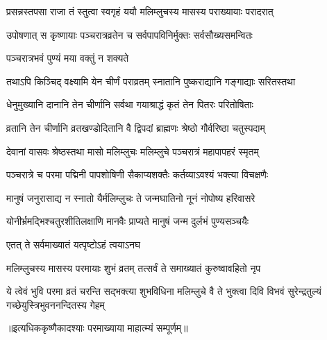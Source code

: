 \twolineshloka
{प्रसन्नस्तपसा राजा तं स्तुत्वा स्वगृहं ययौ}
{मलिम्लुचस्य मासस्य पराख्यायाः परादरात्} %

\twolineshloka
{उपोषणात् स कृष्णायाः पञ्चरात्रव्रतेन च}
{सर्वपापविनिर्मुक्तः सर्वसौख्यसमन्वितः} %



\onelineshloka
{पञ्चरात्रभवं पुण्यं मया वक्तुं न शक्यते} %

\twolineshloka
{तथाऽपि किञ्चिद् वक्ष्यामि येन चीर्णं पराव्रतम्}
{स्नातानि पुष्कराद्यानि गङ्गाद्याः सरितस्तथा} %

\twolineshloka
{धेनुमुख्यानि दानानि तेन चीर्णानि सर्वथा}
{गयाश्राद्धं कृतं तेन पितरः परितोषिताः} %

\twolineshloka
{व्रतानि तेन चीर्णानि व्रतखण्डोदितानि वै}
{द्विपदां ब्राह्मणः श्रेष्ठो गौर्वरिष्ठा चतुस्पदाम्} %

\twolineshloka
{देवानां वासवः श्रेष्ठस्तथा मासो मलिम्लुचः}
{मलिम्लुचे पञ्चरात्रं महापापहरं स्मृतम्} %

\twolineshloka
{पञ्चरात्रे च परमा पद्मिनी पापशोषिणी}
{सैकाप्यशक्तैः कर्तव्याऽवश्यं भक्त्या विचक्षणैः} %

\twolineshloka
{मानुषं जनुरासाद्य न स्नातो यैर्मलिम्लुचः}
{ते जन्मघातिनो नूनं नोपोष्य हरिवासरे} %

\twolineshloka
{योनीर्भ्रमद्भिश्चतुरशीतिलक्षाणि मानवैः}
{प्राप्यते मानुषं जन्म दुर्लभं पुण्यसञ्चयैः} %



\onelineshloka
{एतत् ते सर्वमाख्यातं यत्पृष्टोऽहं त्वयाऽनघ} %

\twolineshloka
{मलिम्लुचस्य मासस्य परमायाः शुभं व्रतम्}
{तत्सर्वं ते समाख्यातं कुरुष्वावहितो नृप} %

\fourlineindentedshloka
{ये त्वेवं भुवि परमा व्रतं चरन्ति}
{सद्भक्त्या शुभविधिना मलिम्लुचे वै}
{ते भुक्त्वा दिवि विभवं सुरेन्द्रतुल्यं}
{गच्छेयुस्त्रिभुवननन्दितस्य गेहम्} %

॥इत्यधिककृष्णैकादश्याः परमाख्याया माहात्म्यं सम्पूर्णम्॥

\hyperref[sec:ekadashi_mahatmyam_vrata_raja]{\closesub}